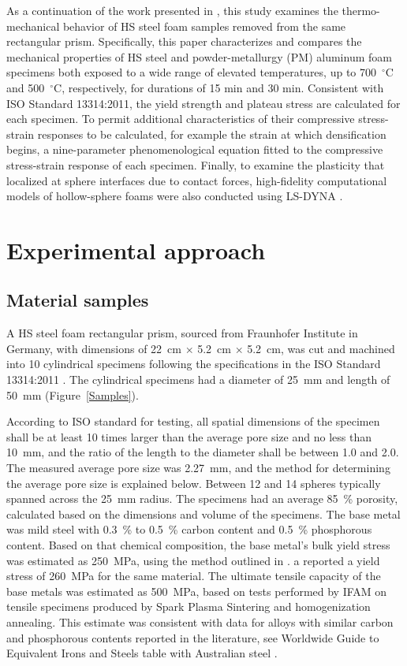 \documentclass[review]{elsarticle}
\begin{document}
As a continuation of the work presented in \cite{Szyniszewskietal2014}, this study examines the thermo-mechanical behavior of HS steel foam samples removed from the same rectangular prism. Specifically, this paper characterizes and compares the mechanical properties of HS steel and powder-metallurgy (PM) aluminum foam specimens both exposed to a wide range of elevated temperatures, up to 700~$^\circ\mathrm{C}$ and 500~$^\circ\mathrm{C}$, respectively, for durations of 15 min and 30 min. Consistent with ISO Standard 13314:2011, the yield strength and plateau stress are calculated for each specimen. To permit additional characteristics of their compressive stress-strain responses to be calculated, for example the strain at which densification begins, a nine-parameter phenomenological equation fitted to the compressive stress-strain response of each specimen. Finally, to examine the plasticity that localized at sphere interfaces due to contact forces, high-fidelity computational models of hollow-sphere foams were also conducted using LS-DYNA \cite{hallquist_ls-dyna_2006}.

\section{Experimental approach}

\subsection*{Material samples}
A HS steel foam rectangular prism, sourced from Fraunhofer Institute in Germany, with dimensions of 22~cm $\times$ 5.2~cm $\times$ 5.2~cm, was cut and machined into 10 cylindrical specimens following the specifications in the ISO Standard 13314:2011 \cite{ISO13314}. The cylindrical specimens had a diameter of 25~mm and length of 50~mm (Figure~\ref{Samples}).

According to ISO standard for testing, all spatial dimensions of the specimen shall be at least 10 times larger than the average pore size and no less than 10~mm, and the ratio of the length to the diameter shall be between 1.0 and 2.0. The measured average pore size was 2.27~mm, and the method for determining the average pore size is explained below. Between 12 and 14 spheres typically spanned across the 25~mm radius. The specimens had an average 85~\% porosity, calculated based on the dimensions and volume of the specimens. The base metal was mild steel with 0.3~\% to 0.5~\% carbon content and 0.5~\% phosphorous content. Based on that chemical composition, the base metal's bulk yield stress was estimated as 250~MPa, using the method outlined in \cite{Cobb1987}. \cite{Smith2012} a reported a yield stress of 260~MPa for the same material. The ultimate tensile capacity of the base metals was estimated as 500~MPa, based on tests performed by IFAM on tensile specimens produced by Spark Plasma Sintering and homogenization annealing. This estimate was consistent with data for alloys with similar carbon and phosphorous contents reported in the literature, see Worldwide Guide to Equivalent Irons and Steels table with Australian steel \cite{Cobb1987}.
\end{document}
